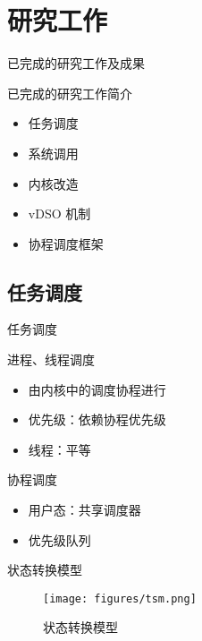 \documentclass{beamer}
\begin{document}
\section{研究工作}

\begin{frame}{已完成的研究工作及成果}
  \begin{block}{已完成的研究工作简介}
    \begin{itemize}
      \setlength{\itemsep}{6pt}
      \item 任务调度
      \item 系统调用
      \item 内核改造
      \item vDSO 机制
      \item 协程调度框架
    \end{itemize}
  \end{block}
\end{frame}

\subsection{任务调度}

\begin{frame}{任务调度}
  \begin{block}{进程、线程调度}
    \begin{itemize}
      \setlength{\itemsep}{6pt}
      \item 由内核中的调度协程进行
      \item 优先级：依赖协程优先级
      \item 线程：平等
    \end{itemize}
  \end{block}
  \begin{block}{协程调度}
    \begin{itemize}
      \setlength{\itemsep}{6pt}
      \item 用户态：共享调度器
      \item 优先级队列
    \end{itemize}
  \end{block}
\end{frame}

\begin{frame}{状态转换模型}
  \begin{figure}[htbp]
    \centering
    \texttt{[image: figures/tsm.png]}
    \caption{状态转换模型}
    \label{fig:tsm}
  \end{figure}
\end{frame}
\end{document}
